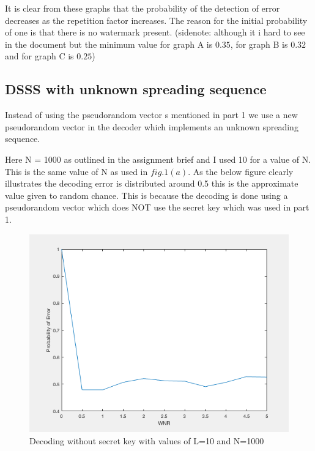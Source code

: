\documentclass[]{assignment}
\begin{document}
It is clear from these graphs that the probability of the detection of error decreases as the repetition factor increases. The reason for the initial probability of one is that there is no watermark present. (sidenote: although it i hard to see in the document but the minimum value for graph A is $0.35$, for graph B is $0.32$ and for graph C is $0.25$)



\subsection{DSSS with unknown spreading sequence}

Instead of using the pseudorandom vector s mentioned in part 1 we use a new pseudorandom vector in the decoder which implements an unknown spreading sequence. 

Here N = 1000 as outlined in the assignment brief and I used 10 for a value of N. This is the same value of N as used in $fig. 1(a)$. As the below figure clearly illustrates the decoding error is distributed around 0.5 this is the approximate value given to random chance. This is because the decoding is done using a pseudorandom vector which does NOT use the secret key which was used in part 1.

\begin{figure}[h] 
\centering
\includegraphics[scale=0.75]{unknown_ss}
\caption{\label{fig:imgfilter1} Decoding without secret key with values of L=10 and N=1000}
\end{figure} 

\label{last_page}



 
\end{document}
